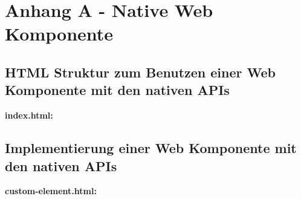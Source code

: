 \chapter*{Anhang A - Native Web Komponente}\label{anhang-a---native-web-komponente}

\section*{HTML Struktur zum Benutzen einer Web Komponente mit den nativen APIs}\label{html-struktur-zum-benutzen-einer-web-komponente-mit-den-nativen-apis}

\textbf{index.html:}

\begin{Shaded}
\begin{Highlighting}[]
\DataTypeTok{>}
\KeywordTok{>}
  \KeywordTok{>}

  \KeywordTok{>}

  \KeywordTok{>}

\end{Highlighting}
\end{Shaded}

\section*{Implementierung einer Web Komponente mit den nativen
APIs}\label{implementierung-einer-web-komponente-mit-den-nativen-apis}

\textbf{custom-element.html:}

